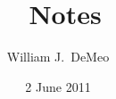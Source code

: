 \newcommand{\subsectionspace}{~\\[-6pt]}
\newcommand{\codesize}{\footnotesize}
\newcommand{\<}{\ensuremath{\langle}}
\renewcommand{\>}{\ensuremath{\rangle}}
\newcommand{\GL}{\ensuremath{\mathrm{GL}}}
\newcommand{\SL}{\ensuremath{\mathrm{SL}}}
\newcommand{\GU}{\ensuremath{\mathrm{GU}}}
\newcommand{\SU}{\ensuremath{\mathrm{SU}}}
\newcommand{\PGL}{\ensuremath{\mathrm{PGL}}}
\newcommand{\PGU}{\ensuremath{\mathrm{PGU}}}
\newcommand{\PSL}{\ensuremath{\mathrm{PSL}}}
\newcommand{\PSU}{\ensuremath{\mathrm{PSU}}}
\newcommand{\Eq}{\ensuremath{\mathrm{Eq}}}
\newcommand{\F}{\ensuremath{\mathbb{F}}}
\newcommand{\Stab}{\ensuremath{\mathrm{Stab}}}
\newcommand{\sR}{\ensuremath{\mathscr{R}}}
\newcommand{\sF}{\ensuremath{\mathscr{F}}}
\newcommand{\Sub}{\ensuremath{\mathrm{Sub}}}
\newcommand{\Sym}{\ensuremath{\mathrm{Sym}}}
\newcommand{\Z}{\ensuremath{\mathbb{Z}}}
\newcommand{\Con}{\ensuremath{\mathrm{Con}}}
\newcommand{\meet}{\ensuremath{\wedge}}
\newcommand{\bn}{\ensuremath{\mathbf{n}}}
\newcommand{\bx}{\ensuremath{\mathbf{x}}}
\newcommand{\by}{\ensuremath{\mathbf{y}}}
\newcommand{\subnormal}{\ensuremath{\trianglelefteqslant}}
\newcommand{\supnormal}{\ensuremath{\trianglerighteqslant}}
\newcommand{\notsubnormal}{\ensuremath{\ntrianglelefteqslant}}
\renewcommand{\leq}{\ensuremath{\leqslant}}
\renewcommand{\nleq}{\ensuremath{\nleqslant}}
\renewcommand{\geq}{\ensuremath{\geqslant}}
\newcommand{\id}[1]{\ensuremath{\mathrm{id}_{#1}}}
\newcommand{\bA}{\ensuremath{\mathbf{A}}}
\newcommand{\bX}{\ensuremath{\mathbf{X}}}
\newcommand{\Aut}{\ensuremath{\mathrm{Aut}}}
\newcommand{\End}{\ensuremath{\mathrm{End}}}

\newcommand{\dom}{\ensuremath{\mathrm{dom}\,}}
\newcommand{\fld}{\ensuremath{\mathrm{fld}\,}}
\newcommand{\ran}{\ensuremath{\mathrm{ran}\,}}

\title{\gap\ Notes}
\author{William J.~DeMeo}
\date{2 June 2011}


\maketitle
\tableofcontents

\newpage

